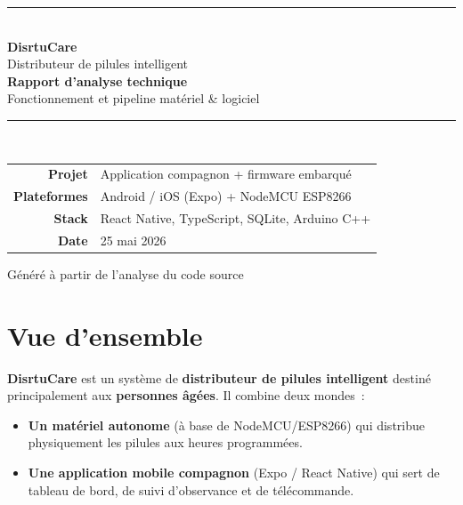 \documentclass[11pt,a4paper]{article}
\begin{document}
\begin{titlepage}
\centering
\vspace*{3cm}
{\color{teal}\rule{\linewidth}{2pt}}\\[1cm]
{\Huge\bfseries\color{navy} DisrtuCare}\\[0.4cm]
{\Large\color{midgray} Distributeur de pilules intelligent}\\[0.8cm]
{\LARGE\bfseries\color{tealdark} Rapport d'analyse technique}\\[0.3cm]
{\large\color{midgray} Fonctionnement et pipeline mat\'eriel \& logiciel}\\[1cm]
{\color{teal}\rule{\linewidth}{2pt}}\\[2cm]

\begin{tabular}{rl}
\textbf{Projet} & Application compagnon + firmware embarqu\'e \\[4pt]
\textbf{Plateformes} & Android / iOS (Expo) + NodeMCU ESP8266 \\[4pt]
\textbf{Stack} & React Native, TypeScript, SQLite, Arduino C++ \\[4pt]
\textbf{Date} & 25 mai 2026 \\
\end{tabular}

\vfill
{\color{midgray}\small G\'en\'er\'e \`a partir de l'analyse du code source}
\end{titlepage}

\tableofcontents
\newpage

\section{Vue d'ensemble}

\textbf{DisrtuCare} est un syst\`eme de \textbf{distributeur de pilules intelligent}
destin\'e principalement aux \textbf{personnes \^ag\'ees}. Il combine deux mondes~:

\begin{itemize}
  \item \textbf{Un mat\'eriel autonome} (\`a base de NodeMCU/ESP8266) qui distribue
        physiquement les pilules aux heures programm\'ees.
  \item \textbf{Une application mobile compagnon} (Expo / React Native) qui sert de
        tableau de bord, de suivi d'observance et de t\'el\'ecommande.
\end{itemize}
\end{document}

